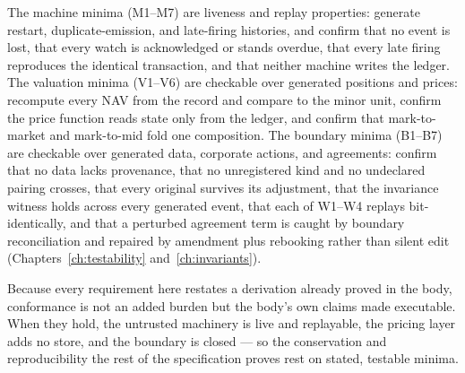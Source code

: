 The machine minima (M1--M7) are liveness and replay properties: generate restart,
duplicate-emission, and late-firing histories, and confirm that no event is lost, that
every watch is acknowledged or stands overdue, that every late firing reproduces the
identical transaction, and that neither machine writes the ledger. The valuation minima
(V1--V6) are checkable over generated positions and prices: recompute every NAV from the
record and compare to the minor unit, confirm the price function reads state only from the
ledger, and confirm that mark-to-market and mark-to-mid fold one composition. The boundary
minima (B1--B7) are checkable over generated data, corporate actions, and agreements:
confirm that no
data lacks provenance, that no unregistered kind and no undeclared pairing crosses, that
every original survives its adjustment, that the invariance witness holds across every
generated event, that each of W1--W4 replays bit-identically, and that a perturbed
agreement term is caught by boundary reconciliation and repaired by amendment plus
rebooking rather than silent edit
(Chapters~\ref{ch:testability} and~\ref{ch:invariants}).

Because every requirement here restates a derivation already proved in the body,
conformance is not an added burden but the body's own claims made executable. When they
hold, the untrusted machinery is live and replayable, the pricing layer adds no store, and
the boundary is closed --- so the conservation and reproducibility the rest of the
specification proves rest on stated, testable minima.
